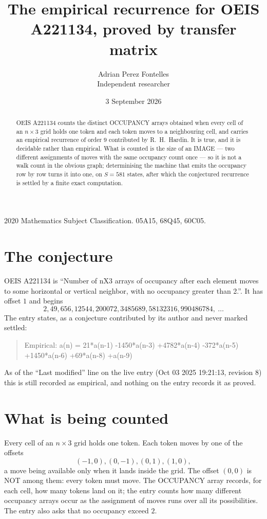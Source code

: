 \documentclass[11pt,a4paper]{article}
\title{The empirical recurrence for OEIS A221134, proved by transfer matrix}
\author{Adrian Perez Fontelles\\ \small Independent researcher}
\date{3 September 2026}
\theoremstyle{plain}
\theoremstyle{definition}
\begin{document}
\maketitle

\begin{abstract}
OEIS A221134 counts the distinct OCCUPANCY arrays obtained when every cell of an $n\times3$ grid
holds one token and each token moves to a neighbouring cell, and carries an empirical
recurrence of order $9$ contributed by R.~H.~Hardin. It is true, and it is decidable
rather than empirical. What is counted is the size of an IMAGE --- two different assignments of
moves with the same occupancy count once --- so it is not a walk count in the obvious graph;
determinising the machine that emits the occupancy row by row turns it into one, on $S=581$
states, after which the conjectured recurrence is settled by a finite exact computation.
\end{abstract}

\noindent\small 2020 Mathematics Subject Classification. 05A15, 68Q45, 60C05.\normalsize

\section{The conjecture}

OEIS A221134 is ``Number of nX3 arrays of occupancy after each element moves to some horizontal or vertical neighbor, with no occupancy greater than 2.''. It has offset $1$ and begins
\[
2, 49, 656, 12544, 200072, 3485689, 58132316, 990486784,\ \dots
\]
The entry states, as a conjecture contributed by its author and never marked settled:
\begin{quote}
Empirical: a(n) = 21*a(n-1) -1450*a(n-3) +4782*a(n-4) -372*a(n-5) +1450*a(n-6) +69*a(n-8) +a(n-9)
\end{quote}
As of the ``Last modified'' line on the live entry (Oct 03 2025 19:21:13, revision 8) this is still
recorded as empirical, and nothing on the entry records it as proved.

\section{What is being counted}

Every cell of an $n\times3$ grid holds one token. Each token moves by one of the offsets
\[
(-1,0), (0,-1), (0,1), (1,0),
\]
a move being available only when it lands inside the grid. The offset $(0,0)$ is NOT among them: every token must move. The OCCUPANCY array
records, for each cell, how many tokens land on it; the entry counts how many different
occupancy arrays occur as the assignment of moves runs over all its possibilities. The entry also asks that no occupancy exceed $2$.
\end{document}
